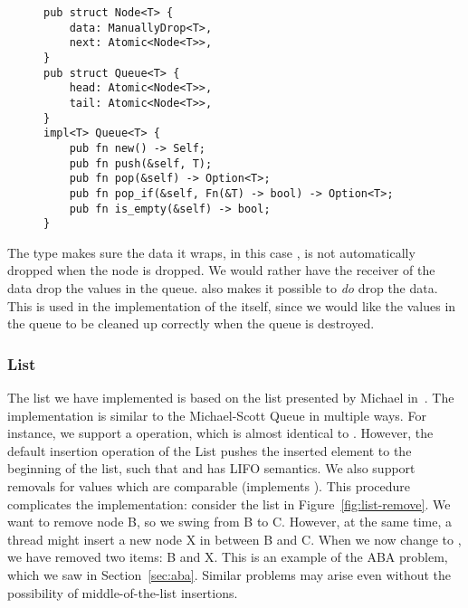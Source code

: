 \documentclass[b5paper]{report}
\begin{document}
\begin{figure}[ht]
\begin{lstlisting}[caption=Structs for the Michael-Scott Queue,label=lst:msqueue]
pub struct Node<T> {
    data: ManuallyDrop<T>,
    next: Atomic<Node<T>>,
}
pub struct Queue<T> {
    head: Atomic<Node<T>>,
    tail: Atomic<Node<T>>,
}
impl<T> Queue<T> {
    pub fn new() -> Self;
    pub fn push(&self, T);
    pub fn pop(&self) -> Option<T>;
    pub fn pop_if(&self, Fn(&T) -> bool) -> Option<T>;
    pub fn is_empty(&self) -> bool;
}
\end{lstlisting}
\end{figure}

The  type makes sure the data it wraps, in this case
, is not automatically dropped when the node is dropped. We would rather
have the receiver of the data drop the values in the queue. 
also makes it possible to \emph{do} drop the data. This is used in the
 implementation of the  itself, since we would like the
values in the queue to be cleaned up correctly when the queue is destroyed.

\subsubsection{List\label{sec:impl-list}}

The list we have implemented is based on the list presented by Michael
in~\cite{michael2002high}. The implementation is similar to the Michael-Scott
Queue in multiple ways. For instance, we support a 
operation, which is almost identical to . However, the default
insertion operation of the List pushes the inserted element to the beginning of
the list, such that  and  has LIFO
semantics. We also support removals for values which are comparable (implements
). This procedure complicates the implementation: consider the
list in Figure~\ref{fig:list-remove}. We want to remove node B, so we swing
 from B to C. However, at the same time, a thread might insert a
new node X in between B and C. When we now change  to , we
have removed two items: B and X. This is an example of the ABA problem, which we
saw in Section~\ref{sec:aba}. Similar problems may arise even without the
possibility of middle-of-the-list insertions.
\end{document}
